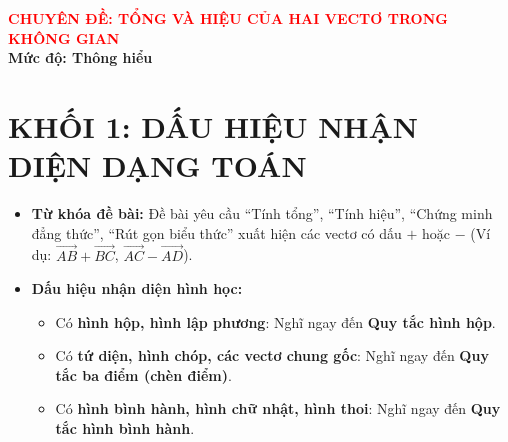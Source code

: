 \documentclass[12pt,a4paper]{article}
\begin{document}
\begin{center}
    \Large \textbf{\textcolor{red}{CHUYÊN ĐỀ: TỔNG VÀ HIỆU CỦA HAI VECTƠ TRONG KHÔNG GIAN}} \\
    \vspace{0.2cm}
    \large \textbf{Mức độ: Thông hiểu}
\end{center}

\vspace{0.5cm}

\section*{KHỐI 1: DẤU HIỆU NHẬN DIỆN DẠNG TOÁN}
\begin{tcolorbox}[colback=blue!5!white,colframe=blue!75!black,title=\textbf{Nhìn phát biết ngay}]
\begin{itemize}
    \item \textbf{Từ khóa đề bài:} Đề bài yêu cầu ``Tính tổng'', ``Tính hiệu'', ``Chứng minh đẳng thức'', ``Rút gọn biểu thức'' xuất hiện các vectơ có dấu $+$ hoặc $-$ (Ví dụ: $\vec{AB} + \vec{BC}$, $\vec{AC} - \vec{AD}$).
    \item \textbf{Dấu hiệu nhận diện hình học:}
    \begin{itemize}
        \item Có \textbf{hình hộp, hình lập phương}: Nghĩ ngay đến \textbf{Quy tắc hình hộp}.
        \item Có \textbf{tứ diện, hình chóp, các vectơ chung gốc}: Nghĩ ngay đến \textbf{Quy tắc ba điểm (chèn điểm)}.
        \item Có \textbf{hình bình hành, hình chữ nhật, hình thoi}: Nghĩ ngay đến \textbf{Quy tắc hình bình hành}.
    \end{itemize}
\end{itemize}
\end{tcolorbox}

\end{document}

